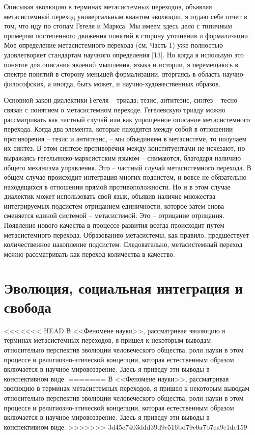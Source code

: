 \documentclass{book}
\begin{document}
Описывая эволюцию в терминах метасистемных переходов, объявляя метасистемный переход универсальным квантом эволюции, я отдаю себе отчет в том, что иду по стопам Гегеля и Маркса. Мы имеем здесь дело с типичным примером постепен­ного движения понятий в сторону уточнения и формализации. Мое определение метасистемного перехода (см. Часть 1) уже полностью удовлетворяет стандартам научного определения [13]. Но когда я использую это понятие для описания явлений мыш­ления, языка и истории, я перемещаюсь в спектре понятий в сторону меньшей формализации, вторгаясь в область научно-философских, а иногда, быть может, и научно-художественных образов.

Основной закон диалектики Гегеля -- триада: тезис, антитезис, синтез -- тесно связан с понятием о метасистемном переходе. Гегелевскую триаду можно рассматривать как частный случай или как упрощенное описание метасистемного перехода. Когда два элемента, которые находятся между собой в отношении противоречия -- тезис и антитезис, -- мы объединяем в метасистеме, то получаем их синтез. В этом синтезе противоречия между конституентами не исчезают, но -- выражаясь гегельянско-марксистским языком -- снимаются, благодаря наличию общего механизма управления. Это -- частный случай метасистемного перехода. В общем случае происходит интег­рация многих подсистем, и вовсе не обязательно находящихся в отношении прямой противоположности. Но и в этом случае диалектик может использовать свой язык, объявив наличие множества  интегрируемых подсистем отрицанием единичности, которое затем снова сменяется единой системой -- метасистемой. Это -- отрицание отрицания. Появление нового качества в процессе развития всегда происходит 
путем метасистемного перехода. Образованию метасистемы, как правило, предшествует количественное накопление подсистем. Следовательно, метасистемный переход можно рассматривать как переход количества в качество.


\section{Эволюция, социальная интеграция и свобода}

<<<<<<< HEAD
В <<Феномене науки>>, рассматривая эволюцию в терминах метасистемных переходов, я пришел к некоторым выводам относительно перспектив эволюции человеческого общества, роли науки в этом процессе и религиозно‑этической концепции, которая естественным образом включается в научное ми­ровоззрение. Здесь я приведу эти выводы в конспективном виде.
=======
В <<Феномене науки>>, рассматривая эволюцию в терминах метасистемных переходов, я пришел к некоторым выводам относительно перспектив эволюции человеческого общества, роли науки в этом процессе и религиозно-этической концепции, которая естественным образом включается в научное ми­ровоззрение. Здесь я приведу эти выводы в конспективном виде.
>>>>>>> 3d45c7403ddd39d9e516bd79e0a7b7ca9e1dc159
\end{document}
